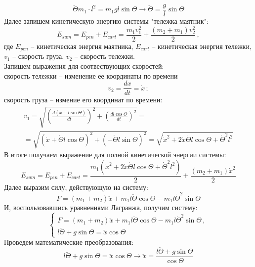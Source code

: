 \documentclass[a5paper, 10pt]{article}
\theoremstyle{definition}
\theoremstyle{plain}
\theoremstyle{remark}
\begin{document}
\begin{equation}
\ddot{\Theta}  m_1 \cdot l^2  = m_1 g l  \sin \Theta \to \ddot{\Theta} = \frac{g}{l} \sin \Theta
\end{equation}
Далее запишем кинетическую энергию системы "тележка-маятник":
\begin{equation}
E_{sum} = E_{pen} + E_{cart} = \frac{m_1 v_1^2}{2} +  \frac{(m_2 + m_1) v_2^2}{2} \, ,
\end{equation}
где $ E_{pen}$ -- кинетическая энергия маятника, $ E_{cart}$ -- кинетическая энергия тележки, $v_1$ -- скорость груза, $v_2$ -- скорость тележки.\\
Запишем выражения для соотвествующих скоростей:\\
 скорость тележки -- изменение ее координаты по времени
\begin{equation}
v_2 = \frac{dx}{dt} = \dot{x} \, ;
\end{equation}
скорость груза -- измение его координат по времени:
\begin{multline}
v_1 = \sqrt{\left( \frac{d \left( x + l \sin \Theta  \right)}{dt} \right)^2 + \left(  \frac{d l \cos \Theta }{dt}  \right)^2} = \\
= \sqrt{\left( \dot{x} + \dot{\Theta} l \cos \Theta \right)^2 + \left( -  \dot{\Theta} l \sin \Theta \right)^2} = 
 \sqrt{\dot{x}^2 +2 \dot{x} \dot{\Theta} l \cos \Theta +  \dot{\Theta}^2 l^2}
\end{multline}
В итоге получаем выражение для полной кинетической энергии системы:
\begin{equation}
E_{sum} = E_{pen} + E_{cart} = \frac{m_1 (\dot{x}^2 +2 \dot{x} \dot{\Theta} l \cos \Theta +  \dot{\Theta}^2 l^2)}{2} +  \frac{(m_2 + m_1) \dot{x}^2}{2} 
\end{equation}
Далее выразим силу, действующую на систему:
\begin{equation}
F = (m_1 + m_2) \ddot{x} + m_1 l \ddot{\Theta} \cos \Theta - m_1 l \dot{\Theta} ^2 \sin \Theta
\end{equation}
И, воспользовавшись уравнениями Лагранжа, получим систему:
\begin{equation}
\begin{cases}
F = (m_1 + m_2) \ddot{x} + m_1 l \ddot{\Theta} \cos \Theta - m_1 l \dot{\Theta} ^2 \sin \Theta \, , \\
l \ddot{\Theta} + g \sin \Theta = \ddot{x} \cos \Theta
\end{cases}
\end{equation} 
Проведем математические преобразования:
\begin{equation}
l \ddot{\Theta} + g \sin \Theta = \ddot{x} \cos \Theta \to  \ddot{x} = \frac{l \ddot{\Theta} + g \sin \Theta }{ \cos \Theta}
\end{equation}
\end{document}
